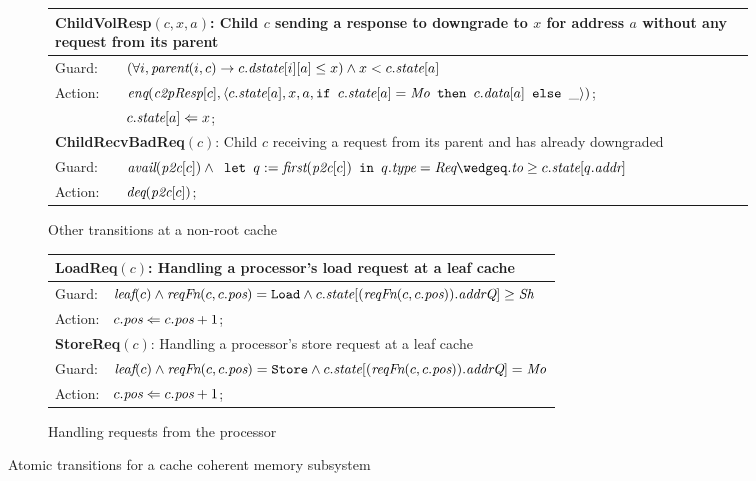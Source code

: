 \begin{figure}
\begin{subfigure}{\textwidth}
\centering
\begin{tabular}{|ll|}
\hline
\multicolumn{2}{|p{\textwidth}|}{\textbf{ChildVolResp}$(c, x, a)$: Child $c$ sending a response to downgrade to $x$ for address $a$ without any request from its parent}\\
\hline
Guard: & $(\forall i, \textit{parent}(i, c) \rightarrow c.\textit{dstate}[i][a] \le x) \wedge x < c.\textit{state}[a]$\\
\hline
Action: & $\enq(\cpResp[c], \langle c.\state[a], x, a,%
\myif c.\state[a] = \Mo \mythen c.\data[a] \myelse \_\rangle)$;\\
& $c.\textit{state}[a] \Leftarrow x$;\\
\hline
\hline
\multicolumn{2}{|p{\textwidth}|}{\textbf{ChildRecvBadReq}$(c)$: Child $c$ receiving a request from its parent and has already downgraded}\\
\hline
Guard: & 
$\avail(\pc[c]) \wedge \mylet q := \first(\pc[c]) \myin q.\typ = \Req \wedge%
q.\myto \ge c.\state[q.\addr]$\\
\hline
Action: & $\textit{deq}(\textit{p2c}[c])$;\\
\hline
\end{tabular}
\caption{Other transitions at a non-root cache}
\end{subfigure}

\begin{subfigure}{\textwidth}
\centering
\begin{tabular}{|ll|}
\hline
\multicolumn{2}{|l|}{\textbf{LoadReq}$(c)$: Handling a processor's load request at a leaf cache}\\
\hline
Guard: & $\textit{leaf}(c) \wedge \textit{reqFn}(c, c.\textit{pos}) = \texttt{Load} \wedge c.\textit{state}[(\textit{reqFn}(c, c.\textit{pos})).\textit{addrQ}] \ge \textit{Sh}$\\
\hline
Action:& $c.\textit{pos} \Leftarrow c.\textit{pos} + 1$;\\
\hline
\hline
\multicolumn{2}{|l|}{\textbf{StoreReq}$(c)$: Handling a processor's store request at a leaf cache}\\
\hline
Guard: & $\textit{leaf}(c) \wedge \textit{reqFn}(c, c.\textit{pos}) = \texttt{Store} \wedge c.\textit{state}[(\textit{reqFn}(c, c.\textit{pos})).\textit{addrQ}] = \textit{Mo}$\\
\hline
Action:& $c.\textit{pos} \Leftarrow c.\textit{pos} + 1$;\\
\hline
\end{tabular}
\caption{Handling requests from the processor}
\end{subfigure}
\caption{Atomic transitions for a cache coherent memory subsystem}
\label{trans}
\end{figure}

